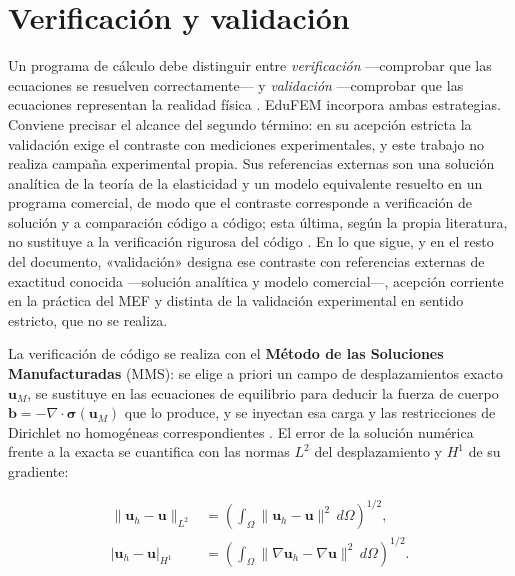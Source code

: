 \section{Verificación y validación}
\label{sec:verificacion-validacion}

Un programa de cálculo debe distinguir entre \emph{verificación} —comprobar que las ecuaciones se resuelven correctamente— y \emph{validación} —comprobar que las ecuaciones representan la realidad física \autocite[pp.~13-14]{oberkampf2010vv}. EduFEM incorpora ambas estrategias. Conviene precisar el alcance del segundo término: en su acepción estricta la validación exige el contraste con mediciones experimentales, y este trabajo no realiza campaña experimental propia. Sus referencias externas son una solución analítica de la teoría de la elasticidad y un modelo equivalente resuelto en un programa comercial, de modo que el contraste corresponde a verificación de solución y a comparación código a código; esta última, según la propia literatura, no sustituye a la verificación rigurosa del código \autocite[pp.~173-174]{oberkampf2010vv}. En lo que sigue, y en el resto del documento, «validación» designa ese contraste con referencias externas de exactitud conocida —solución analítica y modelo comercial—, acepción corriente en la práctica del MEF y distinta de la validación experimental en sentido estricto, que no se realiza.

La verificación de código se realiza con el \textbf{Método de las Soluciones Manufacturadas} (MMS): se elige a priori un campo de desplazamientos exacto $\bm{u}_M$, se sustituye en las ecuaciones de equilibrio para deducir la fuerza de cuerpo $\bm{b} = -\nabla\cdot\bm{\sigma}(\bm{u}_M)$ que lo produce, y se inyectan esa carga y las restricciones de Dirichlet no homogéneas correspondientes \autocites[pp.~21, 26]{salari2000mms}[pp.~219-222]{oberkampf2010vv}. El error de la solución numérica frente a la exacta se cuantifica con las normas $L^2$ del desplazamiento y $H^1$ de su gradiente:

\begin{equation}
\begin{aligned}
\|\bm{u}_h - \bm{u}\|_{L^2} &= \left( \int_\Omega \|\bm{u}_h - \bm{u}\|^2 \, d\Omega \right)^{1/2}, \\
|\bm{u}_h - \bm{u}|_{H^1} &= \left( \int_\Omega \|\nabla\bm{u}_h - \nabla\bm{u}\|^2 \, d\Omega \right)^{1/2}.
\end{aligned}
\label{eq:normas-error}
\end{equation}

